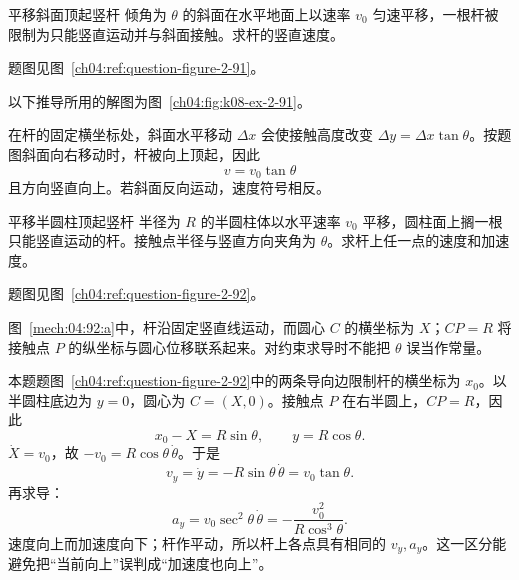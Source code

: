 {\begin{origexamplebox}{平移斜面顶起竖杆}\label{ch04:ex:k08-2-91}
倾角为 $\theta$ 的斜面在水平地面上以速率 $v_0$ 匀速平移，一根杆被限制为只能竖直运动并与斜面接触。求杆的竖直速度。
\par 题图见图~\ref{ch04:ref:question-figure-2-91}。
\KQuestionDN
\end{origexamplebox}
\begin{xesolution}
以下推导所用的解图为图~\ref{ch04:fig:k08-ex-2-91}。

在杆的固定横坐标处，斜面水平移动 $\Delta x$ 会使接触高度改变 $\Delta y=\Delta x\tan\theta$。按题图斜面向右移动时，杆被向上顶起，因此
\MovingConstraintDiagram
\[
\boxed{v=v_0\tan\theta}
\]
且方向竖直向上。若斜面反向运动，速度符号相反。
\end{xesolution}

\begin{origexamplebox}{平移半圆柱顶起竖杆}\label{ch04:ex:k08-2-92}
半径为 $R$ 的半圆柱体以水平速率 $v_0$ 平移，圆柱面上搁一根只能竖直运动的杆。接触点半径与竖直方向夹角为 $\theta$。求杆上任一点的速度和加速度。
\par 题图见图~\ref{ch04:ref:question-figure-2-92}。
\KQuestionDO
\end{origexamplebox}
\begin{xesolution}
\begin{qualityfigure}
\label{mech:04:92:a}
\end{qualityfigure}
图~\ref{mech:04:92:a}中，杆沿固定竖直线运动，而圆心 $C$ 的横坐标为 $X$；$CP=R$ 将接触点 $P$ 的纵坐标与圆心位移联系起来。对约束求导时不能把 $\theta$ 误当作常量。

本题题图~\ref{ch04:ref:question-figure-2-92}中的两条导向边限制杆的横坐标为 $x_0$。以半圆柱底边为 $y=0$，圆心为 $C=(X,0)$。接触点 $P$ 在右半圆上，$CP=R$，因此
\[
x_0-X=R\sin\theta,\qquad y=R\cos\theta.
\]
$\dot X=v_0$，故 $-v_0=R\cos\theta\,\dot\theta$。于是
\[
\boxed{v_y=\dot y=-R\sin\theta\,\dot\theta=v_0\tan\theta}.
\]
再求导：
\[
\boxed{a_y=v_0\sec^2\theta\,\dot\theta
=-\frac{v_0^2}{R\cos^3\theta}}.
\]
速度向上而加速度向下；杆作平动，所以杆上各点具有相同的 $v_y,a_y$。这一区分能避免把“当前向上”误判成“加速度也向上”。
\end{xesolution}


}
